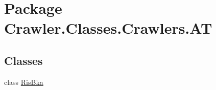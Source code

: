\hypertarget{namespace_crawler_1_1_classes_1_1_crawlers_1_1_a_t}{\section{Package Crawler.\-Classes.\-Crawlers.\-A\-T}
\label{namespace_crawler_1_1_classes_1_1_crawlers_1_1_a_t}
}
\subsection*{Classes}
\begin{DoxyCompactItemize}
\item 
class \hyperlink{class_crawler_1_1_classes_1_1_crawlers_1_1_a_t_1_1_ris_bka}{Ris\-Bka}
\end{DoxyCompactItemize}

